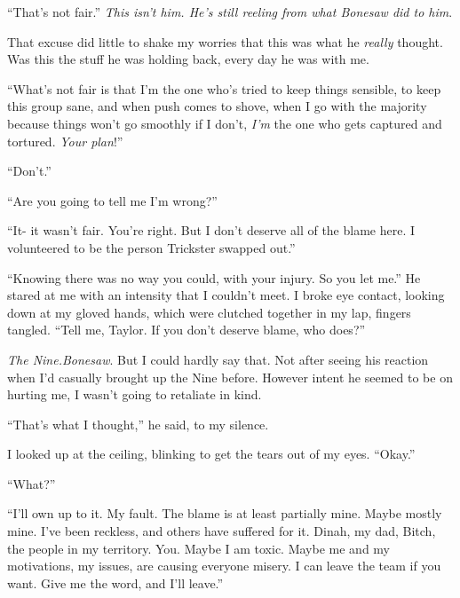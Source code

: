 ``That's not fair.''  \emph{This isn't him.  He's still reeling from what Bonesaw did to him}.



That excuse did little to shake my worries that this was what he \emph{really} thought.  Was this the stuff he was holding back, every day he was with me.



``What's not fair is that I'm the one who's tried to keep things sensible, to keep this group sane, and when push comes to shove, when I go with the majority because things won't go smoothly if I don't, \emph{I'm} the one who gets captured and tortured.  \emph{Your plan}!''



``Don't.''



``Are you going to tell me I'm wrong?''



``It- it wasn't fair.  You're right.  But I don't deserve all of the blame here.  I volunteered to be the person Trickster swapped out.''



``Knowing there was no way you could, with your injury.  So you let me.''  He stared at me with an intensity that I couldn't meet.  I broke eye contact, looking down at my gloved hands, which were clutched together in my lap, fingers tangled.  ``Tell me, Taylor.  If you don't deserve blame, who does?''



\emph{The Nine.}\emph{Bonesaw}.  But I could hardly say that.  Not after seeing his reaction when I'd casually brought up the Nine before.  However intent he seemed to be on hurting me, I wasn't going to retaliate in kind.



``That's what I thought,'' he said, to my silence.



I looked up at the ceiling, blinking to get the tears out of my eyes.  ``Okay.''



``What?''



``I'll own up to it.  My fault.  The blame is at least partially mine.  Maybe mostly mine.  I've been reckless, and others have suffered for it.  Dinah, my dad, Bitch, the people in my territory.  You.  Maybe I am toxic.  Maybe me and my motivations, my issues, are causing everyone misery.  I can leave the team if you want.  Give me the word, and I'll leave.''



